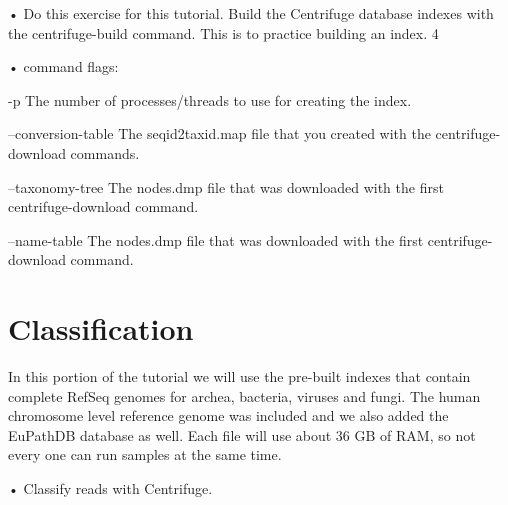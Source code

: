\documentclass[
]{book}
\newenvironment{Shaded}{\begin{snugshade}}{\end{snugshade}}
\newcommand{\AttributeTok}[1]{\textcolor[rgb]{0.77,0.63,0.00}{#1}}
\newcommand{\CommentTok}[1]{\textcolor[rgb]{0.56,0.35,0.01}{\textit{#1}}}
\newcommand{\DataTypeTok}[1]{\textcolor[rgb]{0.13,0.29,0.53}{#1}}
\newcommand{\ExtensionTok}[1]{#1}
\newcommand{\NormalTok}[1]{#1}
\newcommand{\VariableTok}[1]{\textcolor[rgb]{0.00,0.00,0.00}{#1}}
\begin{document}
• Do this exercise for this tutorial. Build the Centrifuge database indexes with the centrifuge-build command. This is to
practice building an index.
4

• command flags:

-p The number of processes/threads to use for creating the index.

--conversion-table The seqid2taxid.map file that you created with the centrifuge-download commands.

--taxonomy-tree The nodes.dmp file that was downloaded with the first centrifuge-download command.

--name-table The nodes.dmp file that was downloaded with the first centrifuge-download command.

\begin{Shaded}
\end{Shaded}

\hypertarget{classification}{%
\section{Classification}\label{classification}}

In this portion of the tutorial we will use the pre-built indexes that contain complete RefSeq genomes for archea,
bacteria, viruses and fungi. The human chromosome level reference genome was included and we also added
the EuPathDB database as well. Each file will use about 36 GB of RAM, so not every one can run
samples at the same time.

• Classify reads with Centrifuge.
\end{document}
